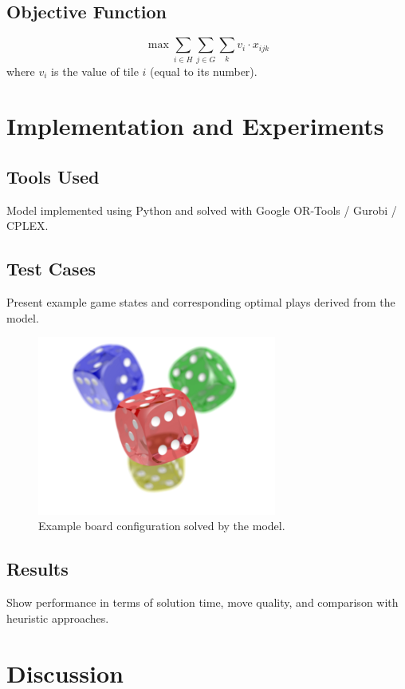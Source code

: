 \documentclass[12pt]{article}
\begin{document}
\subsection{Objective Function}
\[
\max \sum_{i \in H} \sum_{j \in G} \sum_{k} v_i \cdot x_{ijk}
\]
where $v_i$ is the value of tile $i$ (equal to its number).

\section{Implementation and Experiments}
\subsection{Tools Used}
Model implemented using Python and solved with Google OR-Tools / Gurobi / CPLEX.

\subsection{Test Cases}
Present example game states and corresponding optimal plays derived from the model.

\begin{figure}[h]
    \centering
    \includegraphics[width=0.7\textwidth]{Figures/example_image.png}
    \caption{Example board configuration solved by the model.}
\end{figure}

\subsection{Results}
Show performance in terms of solution time, move quality, and comparison with heuristic approaches.

\section{Discussion}
\end{document}
